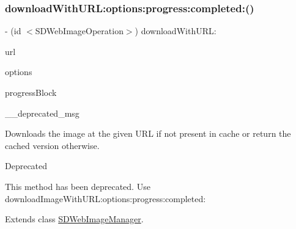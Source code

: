 \subsubsection{\texorpdfstring{download\+With\+U\+R\+L\+:options\+:progress\+:completed\+:()}{downloadWithURL:options:progress:completed:()}\hspace{0.1cm}{\footnotesize\ttfamily [1/3]}}
{\footnotesize\ttfamily -\/ (id $<$S\+D\+Web\+Image\+Operation$>$) download\+With\+U\+R\+L\+: \begin{DoxyParamCaption}\item[{(N\+S\+U\+RL $\ast$)}]{url }\item[{options:(S\+D\+Web\+Image\+Options)}]{options }\item[{progress:(S\+D\+Web\+Image\+Downloader\+Progress\+Block)}]{progress\+Block }\item[{completed:(\char`\"{}Method deprecated. Use \`{}download\+Image\+With\+U\+R\+L\+:options\+:progress\+:completed\+:\`{}\char`\"{})}]{\+\_\+\+\_\+deprecated\+\_\+msg }\end{DoxyParamCaption}}

Downloads the image at the given U\+RL if not present in cache or return the cached version otherwise.

\begin{DoxyRefDesc}{Deprecated}
\item[\mbox{\hyperlink{deprecated__deprecated000021}{Deprecated}}]This method has been deprecated. Use {\ttfamily download\+Image\+With\+U\+R\+L\+:options\+:progress\+:completed\+:} \end{DoxyRefDesc}


Extends class \mbox{\hyperlink{interface_s_d_web_image_manager_a6ed93377fa34b44c02bce84279529dad}{S\+D\+Web\+Image\+Manager}}.

\mbox{\label{category_s_d_web_image_manager_07_deprecated_08_a6ed93377fa34b44c02bce84279529dad}} 
